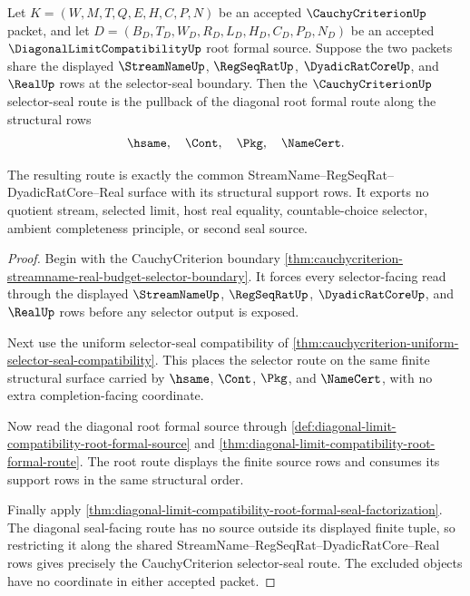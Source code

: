 \begin{theorem}
\label{thm:cauchycriterion-selector-seal-route-pullback}
Let $K=(W,M,T,Q,E,H,C,P,N)$ be an accepted $\CauchyCriterionUp$ packet, and
let $D=(B_D,T_D,W_D,R_D,L_D,H_D,C_D,P_D,N_D)$ be an accepted
$\DiagonalLimitCompatibilityUp$ root formal source. Suppose the two packets
share the displayed $\StreamNameUp$, $\RegSeqRatUp$, $\DyadicRatCoreUp$, and
$\RealUp$ rows at the selector-seal boundary. Then the
$\CauchyCriterionUp$ selector-seal route is the pullback of the diagonal root
formal route along the structural rows
$$
\hsame,\quad \Cont,\quad \Pkg,\quad \NameCert.
$$

The resulting route is exactly the common StreamName--RegSeqRat--DyadicRatCore--Real
surface with its structural support rows. It exports no quotient stream,
selected limit, host real equality, countable-choice selector, ambient
completeness principle, or second seal source.
\end{theorem}
\begin{proof}
Begin with the CauchyCriterion boundary
\autoref{thm:cauchycriterion-streamname-real-budget-selector-boundary}. It
forces every selector-facing read through the displayed
$\StreamNameUp$, $\RegSeqRatUp$, $\DyadicRatCoreUp$, and $\RealUp$ rows before
any selector output is exposed.

Next use the uniform selector-seal compatibility of
\autoref{thm:cauchycriterion-uniform-selector-seal-compatibility}. This places
the selector route on the same finite structural surface carried by
$\hsame$, $\Cont$, $\Pkg$, and $\NameCert$, with no extra completion-facing
coordinate.

Now read the diagonal root formal source through
\autoref{def:diagonal-limit-compatibility-root-formal-source} and
\autoref{thm:diagonal-limit-compatibility-root-formal-route}. The root route
displays the finite source rows and consumes its support rows in the same
structural order.

Finally apply
\autoref{thm:diagonal-limit-compatibility-root-formal-seal-factorization}.
The diagonal seal-facing route has no source outside its displayed finite
tuple, so restricting it along the shared StreamName--RegSeqRat--DyadicRatCore--Real
rows gives precisely the CauchyCriterion selector-seal route. The excluded
objects have no coordinate in either accepted packet.
\end{proof}


